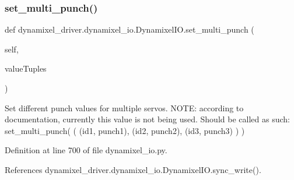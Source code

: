 \mbox{\label{classdynamixel__driver_1_1dynamixel__io_1_1_dynamixel_i_o_a113e6ff1c59d67480dc779fe7fa1ba52}} 
\subsubsection{\texorpdfstring{set\+\_\+multi\+\_\+punch()}{set\_multi\_punch()}}
{\footnotesize\ttfamily def dynamixel\+\_\+driver.\+dynamixel\+\_\+io.\+Dynamixel\+I\+O.\+set\+\_\+multi\+\_\+punch (\begin{DoxyParamCaption}\item[{}]{self,  }\item[{}]{value\+Tuples }\end{DoxyParamCaption})}

\begin{DoxyVerb}Set different punch values for multiple servos.
NOTE: according to documentation, currently this value is not being used.
Should be called as such:
set_multi_punch( ( (id1, punch1), (id2, punch2), (id3, punch3) ) )
\end{DoxyVerb}
 

Definition at line 700 of file dynamixel\+\_\+io.\+py.



References dynamixel\+\_\+driver.\+dynamixel\+\_\+io.\+Dynamixel\+I\+O.\+sync\+\_\+write().


